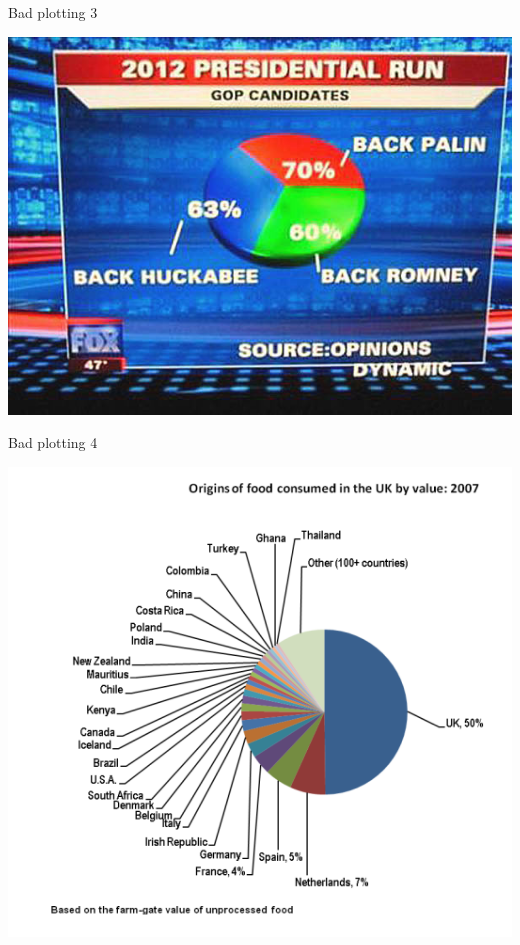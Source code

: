 \documentclass[
  ignorenonframetext,
]{beamer}
\begin{document}
\begin{frame}{Bad plotting 3}
\protect\hypertarget{bad-plotting-3}{}

\includegraphics{fig/bad_scale_100_pie.jpg}

\end{frame}

\begin{frame}{Bad plotting 4}
\protect\hypertarget{bad-plotting-4}{}

\includegraphics{fig/toomuchtext.PNG}

\end{frame}
\end{document}
